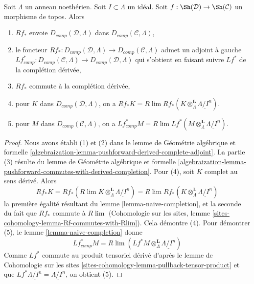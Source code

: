 \begin{lemma}
\label{lemma-pushforward-Noetherian-case}
Soit $\Lambda$ un anneau noethérien. Soit $I \subset \Lambda$ un idéal.
Soit $f : \Sh(\mathcal{D}) \to \Sh(\mathcal{C})$ un morphisme de topos.
Alors
\begin{enumerate}
\item $Rf_*$ envoie $D_{comp}(\mathcal{D}, \Lambda)$
dans $D_{comp}(\mathcal{C}, \Lambda)$,
\item le foncteur $Rf_* : D_{comp}(\mathcal{D}, \Lambda) \to
D_{comp}(\mathcal{C}, \Lambda)$ admet un adjoint à gauche
$Lf_{comp}^* : D_{comp}(\mathcal{C}, \Lambda) \to
D_{comp}(\mathcal{D}, \Lambda)$ qui s'obtient en faisant suivre $Lf^*$ de la
complétion dérivée,
\item $Rf_*$ commute à la complétion dérivée,
\item pour $K$ dans $D_{comp}(\mathcal{D}, \Lambda)$, on a
$Rf_*K = R\lim Rf_*(K \otimes^\mathbf{L}_\Lambda \underline{\Lambda/I^n})$.
\item pour $M$ dans $D_{comp}(\mathcal{C}, \Lambda)$, on a
$Lf^*_{comp}M =
R\lim Lf^*(M \otimes^\mathbf{L}_\Lambda \underline{\Lambda/I^n})$.
\end{enumerate}
\end{lemma}

\begin{proof}
Nous avons établi (1) et (2) dans le
lemme de Géométrie algébrique et formelle
\ref{algebraization-lemma-pushforward-derived-complete-adjoint}.
La partie (3) résulte du
lemme de Géométrie algébrique et formelle
\ref{algebraization-lemma-pushforward-commutes-with-derived-completion}.
Pour (4), soit $K$ complet au sens dérivé. Alors
$$
Rf_*K = Rf_*( R\lim K \otimes^\mathbf{L}_\Lambda \underline{\Lambda/I^n}) =
R\lim Rf_*(K \otimes^\mathbf{L}_\Lambda \underline{\Lambda/I^n})
$$
la première égalité résultant du lemme \ref{lemma-naive-completion},
et la seconde du fait que $Rf_*$ commute à $R\lim$
(Cohomologie sur les sites, lemme
\ref{sites-cohomology-lemma-Rf-commutes-with-Rlim}). Cela démontre (4).
Pour démontrer (5), le lemme \ref{lemma-naive-completion} donne
$$
Lf_{comp}^*M =
R\lim ( Lf^*M \otimes_\Lambda^\mathbf{L} \underline{\Lambda/I^n})
$$
Comme $Lf^*$ commute au produit tensoriel dérivé d'après le
lemme de Cohomologie sur les sites \ref{sites-cohomology-lemma-pullback-tensor-product}
et que $Lf^*\underline{\Lambda/I^n} = \underline{\Lambda/I^n}$,
on obtient (5).
\end{proof}







